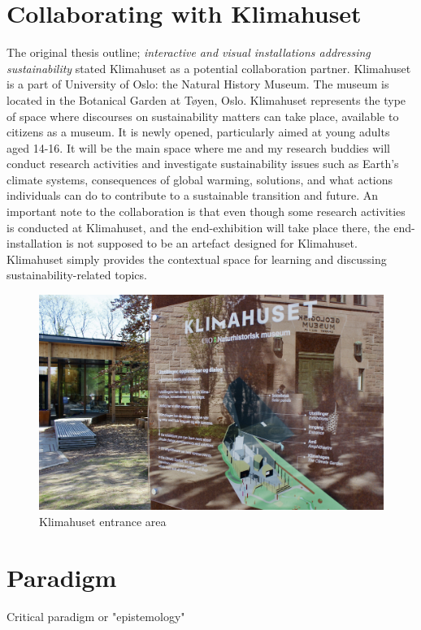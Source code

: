 \section{Collaborating with Klimahuset}
The original thesis outline; \emph{interactive and visual installations addressing sustainability} stated Klimahuset as a potential collaboration partner. Klimahuset is a part of University of Oslo: the Natural History Museum. The museum is located in the Botanical Garden at Tøyen, Oslo. Klimahuset represents the type of space where discourses on sustainability matters can take place, available to citizens as a museum. It is newly opened, particularly aimed at young adults aged 14-16. It will be the main space where me and my research buddies will conduct research activities and investigate sustainability issues such as Earth’s climate systems, consequences of global warming, solutions, and what actions individuals can do to contribute to a sustainable transition and future. An important note to the collaboration is that even though some research activities is conducted at Klimahuset, and the end-exhibition will take place there, the end-installation is not supposed to be an artefact designed for Klimahuset. Klimahuset simply provides the contextual space for learning and discussing sustainability-related topics.

\begin{figure}[H]
\includegraphics[width=12cm]{pictures/klimahuset/klimahuset_info.JPG}
\caption{Klimahuset entrance area}
\centering 
\end{figure}


\section{Paradigm}
Critical paradigm or "epistemology" 

